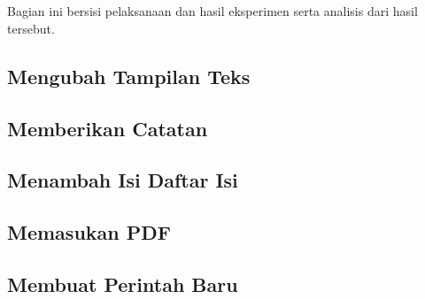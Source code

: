 \chapter{\babLima}
Bagian ini bersisi pelaksanaan dan hasil eksperimen serta analisis dari hasil tersebut.

\section{Mengubah Tampilan Teks}


\section{Memberikan Catatan}


\section{Menambah Isi Daftar Isi}


\section{Memasukan PDF}



\section{Membuat Perintah Baru}

